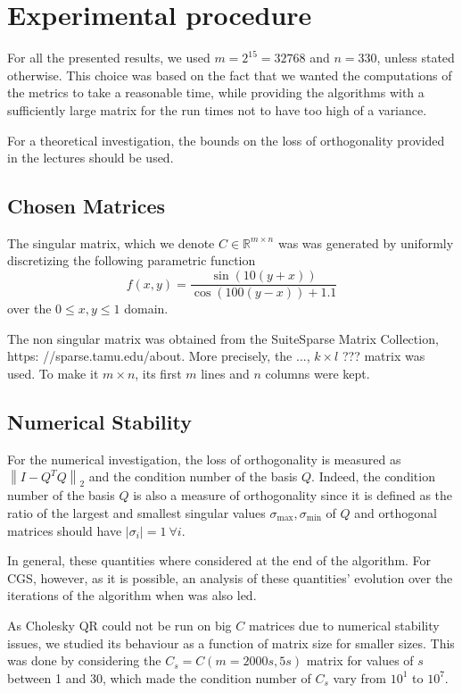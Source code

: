 \documentclass[a4paper, 12pt,oneside]{article}
\begin{document}
	\section{Experimental procedure}
		For all the presented results, we used $m=2^{15}=32768$ and $n=330$, unless stated otherwise. This choice was based on the fact that we wanted the computations of the metrics to take a reasonable time, while providing the algorithms with a sufficiently large matrix for the run times not to have too high of a variance.	

		For a theoretical investigation, the bounds on the loss of orthogonality provided in the lectures should be used. 
		\subsection{Chosen Matrices}
			The singular matrix, which we denote $C \in \mathbb{R}^{m \times n}$ was was generated by uniformly discretizing the following parametric function
			$$
			f(x, y)=\frac{\sin (10(y+x))}{\cos (100(y-x))+1.1}
			$$
			over the $0 \leq x, y \leq 1$ domain.

			The non singular matrix was obtained from the SuiteSparse Matrix Collection, https: //sparse.tamu.edu/about. More precisely, the ..., $k\times l$ ???  matrix was used. To make it $m\times n$, its first $m$ lines and $n$ columns were kept. 
		\subsection{Numerical Stability}
			For the numerical investigation, the loss of orthogonality is measured as $\left\|I-Q^T Q\right\|_2$ and the condition number of the basis $Q$. Indeed, the condition number of the basis $Q$ is also a measure of orthogonality since it is defined as the ratio of the largest and smallest singular values $\sigma_{\max{}},\sigma_{\min}$ of $Q$ and orthogonal matrices should have $|\sigma_i|=1\ \forall i$. 
		
			In general, these quantities where considered at the end of the algorithm. For CGS, however, as it is possible, an analysis of these quantities' evolution over the iterations of the algorithm when was also led.

			As Cholesky QR could not be run on big $C$ matrices due to numerical stability issues, we studied its behaviour as a function of matrix size for smaller sizes. This was done by considering the $C_s=C(m=2000s,5s)$ matrix for values of $s$ between 1 and 30, which made the condition number of $C_s$ vary from $10^1$ to $10^7$.
\end{document}
